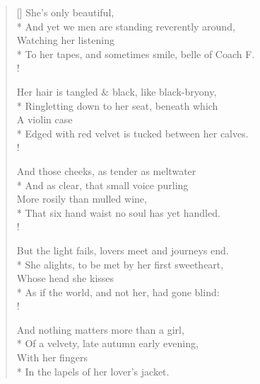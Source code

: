 \settowidth{\versewidth}{To her tapes, and sometimes smile, belle of Coach F.}
\begin{verse}[\versewidth]
She's only  beautiful,\\*
\vin And yet we men are standing reverently around,\\
\vin \vin Watching her listening\\*
To her tapes, and sometimes smile, belle of Coach F.\\!

Her hair is tangled \& black, like black-bryony,\\*
\vin Ringletting down to her seat, beneath which\\
\vin \vin A violin case\\*
Edged with red velvet is tucked between her calves.\\!

And those cheeks, as tender as meltwater\\*
\vin And as clear, that small voice purling\\
\vin \vin More rosily than mulled wine,\\*
That six hand waist no soul has yet handled.\\!

But the light fails, lovers meet and journeys end.\\*
\vin She alights, to be met by her first sweetheart,\\
\vin \vin Whose head she kisses\\*
As if the world, and not her, had gone blind:\\!

And nothing matters more than a girl,\\*
\vin Of a velvety, late autumn early evening,\\
\vin \vin With her fingers\\*
In the lapels of her lover's jacket.
\end{verse}
